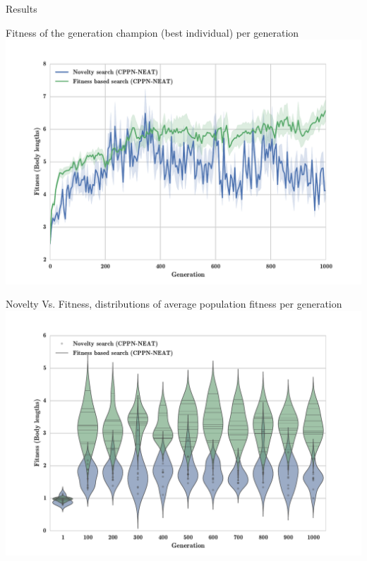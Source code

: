 \documentclass{beamer}
\begin{document}
\begin{frame}[allowframebreaks]{Results}
\begin{minipage}{\textwidth}
\begin{block}{Fitness of the generation champion (best individual) per generation}
\includegraphics[width=1.0\textwidth]{figures/results/AvgGenerChampNoveltyFitnessSize5.pdf}
\end{block}
\end{minipage}

\begin{minipage}{\textwidth}
\begin{block}{Novelty Vs. Fitness, distributions of average population fitness per generation}
\includegraphics[width=1.0\textwidth]{figures/results/ViolinPlotsAvgGenFitSize5.pdf}
\end{block}
\end{minipage}


\end{frame}
\end{document}
